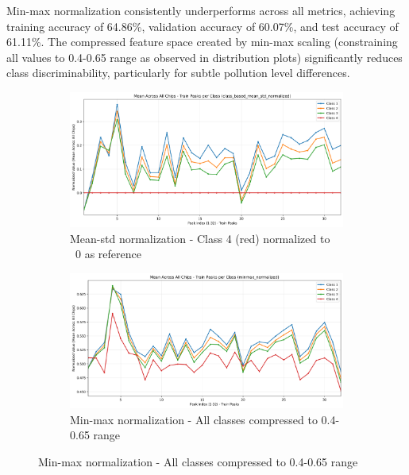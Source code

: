 Min-max normalization consistently underperforms across all metrics, achieving training accuracy of 64.86\%, validation accuracy of 60.07\%, and test accuracy of 61.11\%. The compressed feature space created by min-max scaling (constraining all values to 0.4-0.65 range as observed in distribution plots) significantly reduces class discriminability, particularly for subtle pollution level differences.

\begin{figure}[htbp]
    \centering

    \begin{subfigure}[b]{0.7\textwidth}
        \centering
        \includegraphics[width=\textwidth]{out/10chips/class_based_mean_std_normalized/normalized_data_distribution_class_based_mean_std_normalized.png}
        \caption{Mean-std normalization - Class 4 (red) normalized to ~0 as reference}
    \end{subfigure} 

    \vspace{0.5cm}

    \begin{subfigure}[b]{0.7\textwidth}
        \centering
        \includegraphics[width=\textwidth]{out/10chips/minmax_normalized/normalized_data_distribution_minmax_normalized.png}
        \caption{Min-max normalization - All classes compressed to 0.4-0.65 range}
    \end{subfigure}


\end{figure}
